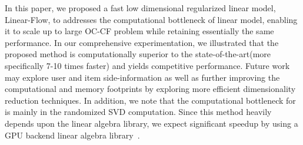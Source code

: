 
In this paper, we proposed a fast low dimensional regularized linear model, Linear-Flow, to addresses the computational bottleneck of linear model, enabling it to scale up to large OC-CF problem while retaining essentially the same performance. In our comprehensive experimentation, we illustrated that the proposed method is computationally superior to the state-of-the-art(more specifically 7-10 times faster) and yields competitive performance. Future work may explore user and item side-information as well as further improving the computational and memory footprints by exploring more efficient dimensionality reduction techniques. 
In addition, we note that the computational bottleneck for \LinearLow is mainly in the randomized SVD computation. Since this method heavily depends upon the linear algebra library, we expect significant speedup by using a GPU backend linear algebra library~\citep{Voronin:GPURSVD}. 

